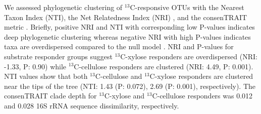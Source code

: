 We assessed phylogenetic clustering of $^{13}$C-responsive OTUs with the
Nearest Taxon Index (NTI), the Net Relatedness Index (NRI)
\citep{Webb2000}, and the consenTRAIT metric \citep{Martiny2013}.
Briefly, positive NRI and NTI with corresponding low P-values indicates
deep phylogenetic clustering whereas negative NRI with high P-values
indicates taxa are overdispersed compared to the null model
\citep{Evans2014a}. NRI and P-values for substrate responder groups
suggest $^{13}$C-xylose responders are overdispersed (NRI: -1.33, P:
0.90) while $^{13}$C-cellulose responders are clustered (NRI: 4.49, P: 0.001).
NTI values show that both $^{13}$C-cellulose and $^{13}$C-xylose responders
are clustered near the tips of the tree (NTI: 1.43 (P: 0.072), 2.69 (P:
0.001), respectively). The consenTRAIT clade depth for $^{13}$C-xylose and
$^{13}$C-cellulose responders was 0.012 and 0.028 16S rRNA sequence
dissimilarity, respectively.





